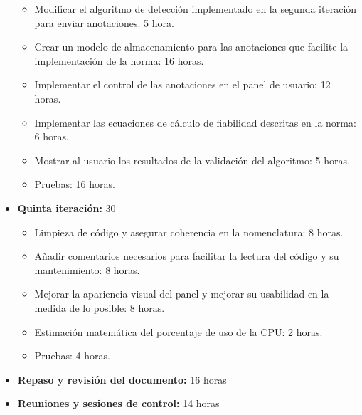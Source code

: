 \begin{itemize}
\begin{itemize}
        \item Modificar el algoritmo de detección implementado en la segunda iteración para enviar anotaciones: 5 hora.
        \item  Crear un modelo de almacenamiento para las anotaciones que facilite la implementación de la norma: 16 horas.
        \item Implementar el control de las anotaciones en el panel de usuario: 12 horas.
        \item Implementar las ecuaciones de cálculo de fiabilidad descritas en la norma: 6 horas.
        \item Mostrar al usuario los resultados de la validación del algoritmo: 5 horas.
        \item Pruebas: 16 horas.
    \end{itemize}
    \item \textbf{Quinta iteración:} 30
    \begin{itemize}
        \item Limpieza de código y asegurar coherencia en la nomenclatura: 8 horas.
        \item Añadir comentarios necesarios para facilitar la lectura del código y su mantenimiento: 8 horas. 
        \item  Mejorar la apariencia visual del panel y mejorar su usabilidad en la medida de lo posible: 8 horas.
        \item Estimación matemática del porcentaje de uso de la CPU: 2 horas.
        \item Pruebas: 4 horas.
    \end{itemize}
    \item \textbf{Repaso y revisión del documento:} 16 horas
    \item \textbf{Reuniones y sesiones de control:} 14 horas
\end{itemize}

\chapterend